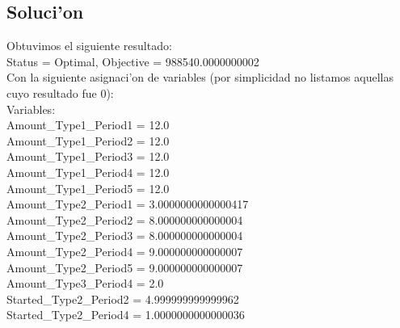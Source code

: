 \subsection{Soluci'on}
Obtuvimos el siguiente resultado:\\
Status = Optimal, Objective = 988540.0000000002\\
Con la siguiente asignaci'on de variables (por simplicidad no listamos aquellas cuyo resultado fue 0):\\
Variables: \\
Amount\_Type1\_Period1 = 12.0\\
Amount\_Type1\_Period2 = 12.0\\
Amount\_Type1\_Period3 = 12.0\\
Amount\_Type1\_Period4 = 12.0\\
Amount\_Type1\_Period5 = 12.0\\
Amount\_Type2\_Period1 = 3.0000000000000417\\
Amount\_Type2\_Period2 = 8.000000000000004\\
Amount\_Type2\_Period3 = 8.000000000000004\\
Amount\_Type2\_Period4 = 9.000000000000007\\
Amount\_Type2\_Period5 = 9.000000000000007\\
Amount\_Type3\_Period4 = 2.0\\
Started\_Type2\_Period2 = 4.999999999999962\\
Started\_Type2\_Period4 = 1.0000000000000036\\
